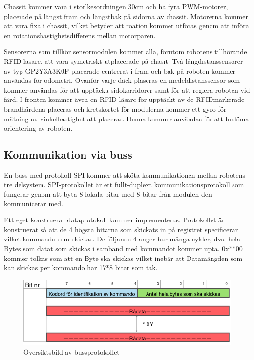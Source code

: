 \documentclass[a4paper,12pt,fleqn]{article}
\begin{document}
Chassit kommer vara i storlkesordningen 30cm och ha fyra PWM-motorer, placerade på längst fram och längstbak på sidorna av chassit. Motorerna kommer att vara fixa i chassit, vilket betyder att roation kommer utföras genom att införa en rotationshastighetsdifferens mellan motorparen.

Sensorerna som tillhör sensormodulen kommer alla, förutom robotens tillhörande RFID-läsare, att vara symetriskt utplacerade på chasit. Två långdistanssensorer av typ GP\-2Y\-3A\-3K\-0F placerade centrerat i fram och bak på roboten kommer användas för odometri. Ovanför varje däck plaseras en medeldistanssensor som kommer användas för att upptäcka sidokorridorer samt för att reglera roboten vid färd.
I fronten kommer även en RFID-läsare för upptäckt av de RFIDmarkerade brandhärdena placeras och kretskortet för modulerna kommer ett gyro för mätning av vinkelhastighet att placeras. Denna kommer användas för att bedöma orientering av roboten.

\subsection{Kommunikation via buss}
En buss med protokoll SPI kommer att sköta kommunikationen mellan robotens tre delsystem. SPI-protokollet är ett fullt-duplext kommunikationsprotokoll som fungerar genom att byta 8 lokala bitar med 8 bitar från modulen den kommunicerar med. 

Ett eget konstruerat dataprotokoll kommer implementeras. Protokollet är konstruerat så att de 4 högsta bitarna som skickats in på registret specificerar vilket kommando som skickas.
De följande 4 anger hur många cykler, dvs. hela Bytes som datat som skickas i samband med kommandot kommer upta. 0x**00 kommer tolkas som att en Byte ska skickas vilket inebär att Datamängden som kan skickas per kommando har 17*8 bitar som tak.

\begin{figure}[htp] %
  \begin{center}
  \includegraphics[keepaspectratio=true,width=\linewidth]{bussprotokoll}  %
  \end{center}
  \caption{Översiktsbild av bussprotokollet} %
  \label{fig:bussprotocol}
\end{figure}
\end{document}
